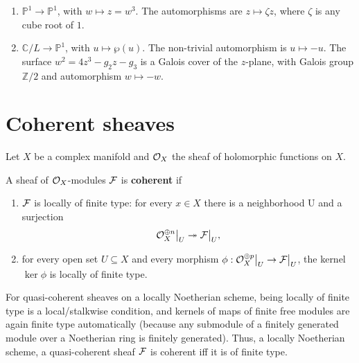 \documentclass[12pt]{article}
\begin{document}
\begin{example}
    \leavevmode
\begin{enumerate}
    \item[(i)] $\mathbb{P}^1 \longrightarrow \mathbb{P}^1$, with $w \longmapsto z = w^3$. The automorphisms are $z \mapsto \zeta z$, where $\zeta$ is any cube root of $1$.

    \item[(ii)] $\mathbb{C}/L \longrightarrow \mathbb{P}^1$, with $u \longmapsto \wp(u)$. The non-trivial automorphism is $u \longmapsto -u$. The surface $w^2 = 4z^3 - g_2 z - g_3$ is a Galois cover of the $z$-plane, with Galois group $\mathbb{Z}/2$ and automorphism $w \mapsto -w$.
\end{enumerate}
\end{example}


\section{Coherent sheaves}
Let $X$ be a complex manifold and ${\mathcal{O}}_X$ the sheaf of holomorphic functions on $X$.
\begin{definition}
A sheaf of ${\mathcal{O}}_X$-modules \({\mathcal{F}}\) is \textbf{coherent} if
\begin{enumerate}
    \item \({\mathcal{F}}\) is locally of finite type: for every $x\in X$ there is a neighborhood U and a surjection
\[
{\mathcal{O}}_X^{\oplus n}\big|_U \twoheadrightarrow {\mathcal{F}}\big|_U,
\]
    \item for every open set \(U\subseteq X\) and every morphism \(\phi:{\mathcal{O}}_X^{\oplus p}\big|_U\to{\mathcal{F}}\big|_U\), the kernel $\ker\phi$ is locally of finite type.
\end{enumerate}
\end{definition}

\begin{remark}
    For quasi-coherent sheaves on a locally Noetherian scheme, being locally of finite type is a local/stalkwise condition, and kernels of maps of finite free modules are again finite type automatically (because any submodule of a finitely generated module over a Noetherian ring is finitely generated). Thus, a locally Noetherian scheme, a quasi-coherent sheaf \({\mathcal{F}}\) is coherent iff it is of finite type.
\end{remark}
\end{document}
